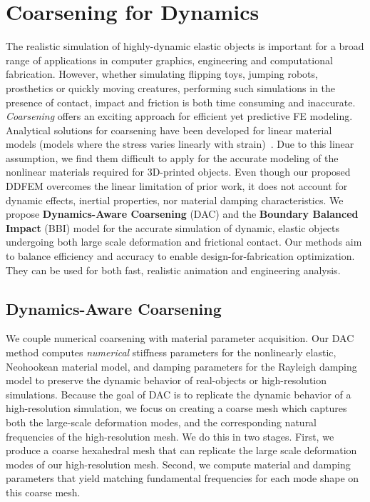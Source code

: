 \section{Coarsening for Dynamics}
The realistic simulation of highly-dynamic elastic objects is important for a broad range of applications in computer graphics, engineering and computational fabrication.
However, whether simulating flipping toys, jumping robots, prosthetics or quickly moving creatures, performing such simulations in the presence of contact, impact and friction is both time consuming and inaccurate.
\emph{Coarsening} offers an exciting approach for efficient yet predictive FE modeling.
Analytical solutions for coarsening have been developed for linear material models (models where the stress varies linearly with strain)~\cite{Kharevych2009,Nesme2009,Torres:2016:HIC}.
Due to this linear assumption, we find them difficult to apply for the accurate modeling of the nonlinear materials required for 3D-printed objects.
Even though our proposed DDFEM overcomes the linear limitation of prior work, it does not account for dynamic effects, inertial properties, nor material damping characteristics.
We propose \textbf{Dynamics-Aware Coarsening} (DAC) and the \textbf{Boundary Balanced Impact} (BBI) model for the accurate simulation of dynamic, elastic objects undergoing both large scale deformation and frictional contact.
Our methods aim to balance efficiency and accuracy to enable design-for-fabrication optimization. They can be used for both fast, realistic animation and engineering analysis. 
\subsection{Dynamics-Aware Coarsening}
We couple numerical coarsening with material parameter acquisition.
Our DAC method computes \emph{numerical} stiffness parameters for the nonlinearly elastic, Neohookean material model, and damping parameters for the Rayleigh damping model to preserve the dynamic behavior of real-objects or high-resolution simulations.
Because the goal of DAC is to replicate the dynamic behavior of a high-resolution simulation, we focus on creating a coarse mesh which captures both the large-scale deformation modes, and the corresponding natural frequencies of the high-resolution mesh.
We do this in two stages. First, we produce a coarse hexahedral mesh that can replicate the large scale deformation modes of our high-resolution mesh.
Second, we compute material and damping parameters that yield matching fundamental frequencies for each mode shape on this coarse mesh.

